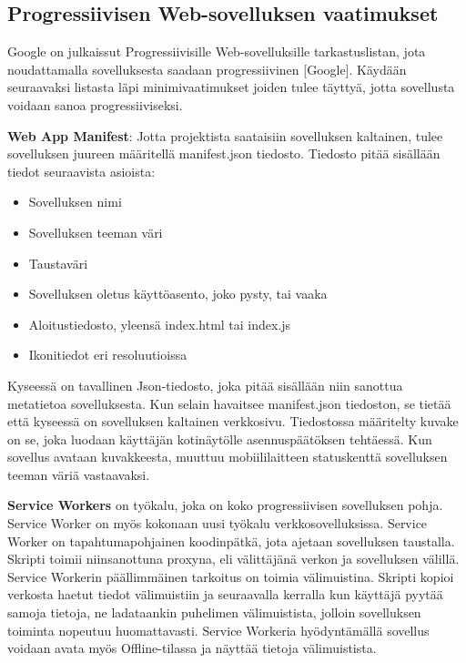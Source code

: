 \documentclass{tktltiki}
\begin{document}
\subsection{Progressiivisen Web-sovelluksen vaatimukset}

Google on julkaissut Progressiivisille Web-sovelluksille tarkastuslistan, jota noudattamalla sovelluksesta saadaan progressiivinen [Google]. Käydään seuraavaksi listasta läpi minimivaatimukset joiden tulee täyttyä, jotta sovellusta voidaan sanoa progressiiviseksi.

\textbf{Web App Manifest}: Jotta projektista saataisiin sovelluksen kaltainen, tulee sovelluksen juureen määritellä manifest.json tiedosto. Tiedosto pitää sisällään tiedot seuraavista asioista:

\begin{itemize}
  \item Sovelluksen nimi
  \item Sovelluksen teeman väri
  \item Taustaväri
  \item Sovelluksen oletus käyttöasento, joko pysty, tai vaaka
  \item Aloitustiedosto, yleensä index.html tai index.js
  \item Ikonitiedot eri resoluutioissa
\end{itemize}

Kyseessä on tavallinen Json-tiedosto, joka pitää sisällään niin sanottua metatietoa sovelluksesta. Kun selain havaitsee manifest.json tiedoston, se tietää että kyseessä on sovelluksen kaltainen verkkosivu. Tiedostossa määritelty kuvake on se, joka luodaan käyttäjän kotinäytölle asennuspäätöksen tehtäessä. Kun sovellus avataan kuvakkeesta, muuttuu mobiililaitteen statuskenttä sovelluksen teeman väriä vastaavaksi.  

\textbf{Service Workers} on työkalu, joka on koko progressiivisen sovelluksen pohja. Service Worker on myös kokonaan uusi työkalu verkkosovelluksissa. Service Worker on tapahtumapohjainen koodinpätkä, jota ajetaan sovelluksen taustalla. Skripti toimii niinsanottuna proxyna, eli välittäjänä verkon ja sovelluksen välillä. Service Workerin päällimmäinen tarkoitus on toimia välimuistina. Skripti kopioi verkosta haetut tiedot välimuistiin ja seuraavalla kerralla kun käyttäjä pyytää samoja tietoja, ne ladataankin puhelimen välimuistista, jolloin sovelluksen toiminta nopeutuu huomattavasti. Service Workeria hyödyntämällä sovellus voidaan avata myös Offline-tilassa ja näyttää tietoja välimuistista. 
\end{document}
